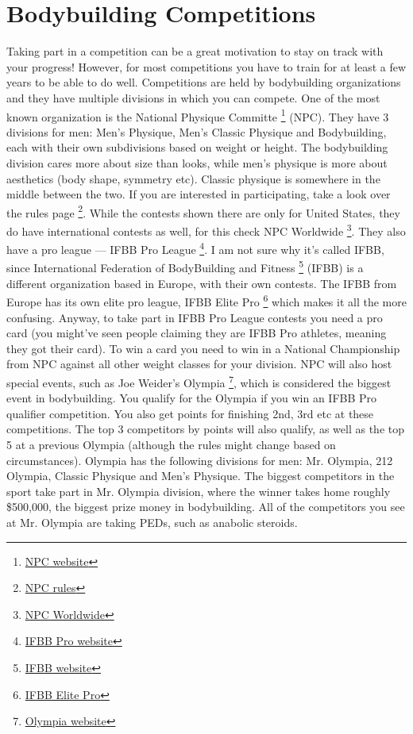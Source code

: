 \documentclass[openany, 12pt]{book}
\begin{document}
        \section{Bodybuilding Competitions}

        Taking part in a competition can be a great motivation to stay on track with your progress! However, for most competitions you have to train for at least a few years to be able to do well.
        Competitions are held by bodybuilding organizations and they have multiple divisions in which you can compete. One of the most known organization is the National Physique Committe
        \footnote{\href{https://npcnewsonline.com/}{NPC website}} (NPC). They have 3 divisions for men: Men's Physique, Men's Classic Physique and Bodybuilding, each with their own subdivisions
        based on weight or height. The bodybuilding division cares more about size than looks, while men's physique is more about aesthetics (body shape, symmetry etc). Classic physique is somewhere
        in the middle between the two. If you are interested in participating, take a look over the rules page
        \footnote{\href{https://npcnewsonline.com/official-bodybuilding-rules/}{NPC rules}}. While the contests shown there are only for United States, they do have international contests
        as well, for this check NPC Worldwide
        \footnote{\href{https://www.ifbbpro.com/category/all-categories/pro-qualifier/}{NPC Worldwide}}. They also have a pro league --- IFBB Pro League
        \footnote{\href{https://www.ifbbpro.com/}{IFBB Pro website}}. I am not sure why it's called IFBB, since International Federation of BodyBuilding and Fitness
        \footnote{\href{https://ifbb.com/}{IFBB website}} (IFBB) is a different organization based in Europe, with their own contests. The IFBB from Europe has its own elite pro league,
        IFBB Elite Pro
        \footnote{\href{https://eliteprocard.com/}{IFBB Elite Pro}} which makes it all the more confusing. Anyway, to take part in IFBB Pro League contests you need a pro card (you might've seen
        people claiming they are IFBB Pro athletes, meaning they got their card). To win a card you need to win in a National Championship from NPC against all other weight classes for your division.
        NPC will also host special events, such as Joe Weider's Olympia
        \footnote{\href{https://mrolympia.com/}{Olympia website}}, which is considered the biggest event in bodybuilding. You qualify for the Olympia if you win an IFBB Pro qualifier competition.
        You also get points for finishing 2nd, 3rd etc at these competitions. The top 3 competitors by points will also qualify, as well as the top 5 at a previous Olympia (although the rules
        might change based on circumstances). Olympia has the following divisions for men: Mr. Olympia, 212 Olympia, Classic Physique and Men's Physique. The biggest competitors in the sport take
        part in Mr. Olympia division, where the winner takes home roughly \$500,000, the biggest prize money in bodybuilding. All of the competitors you see at Mr. Olympia are taking PEDs, such
        as anabolic steroids.
\end{document}
